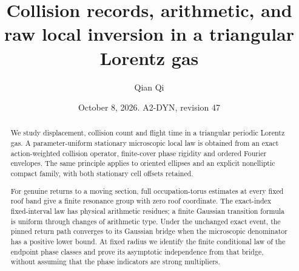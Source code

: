 \documentclass[11pt,reqno]{amsart}
\title[Collision records and raw local inversion]{Collision records, arithmetic, and raw local inversion in a triangular Lorentz gas}
\author{Qian Qi}
\date{October 8, 2026. A2-DYN, revision 47}
\numberwithin{equation}{section}
\theoremstyle{definition}\newtheorem{definition}[theorem]{Definition}
\theoremstyle{remark}\newtheorem{remark}[theorem]{Remark}
\begin{document}
\raggedbottom
\begin{abstract}
We study displacement, collision count and flight time in a triangular
periodic Lorentz gas. A parameter-uniform stationary microscopic local
law is obtained from an exact action-weighted collision operator,
finite-cover phase rigidity and ordered Fourier envelopes. The same
principle applies to oriented ellipses and an explicit nonelliptic
compact family, with both stationary cell offsets retained.

For genuine returns to a moving section, full occupation-torus
estimates at every fixed roof band give a finite resonance group with
zero roof coordinate. The exact-index fixed-interval law has physical
arithmetic residues; a finite Gaussian transition formula is uniform
through changes of arithmetic type. Under the unchanged exact event,
the pinned return path converges to its Gaussian bridge when the
microscopic denominator has a positive lower bound. At fixed radius
we identify the finite conditional law of the endpoint phase classes
and prove its asymptotic independence from that bridge, without
assuming that the phase indicators are strong multipliers.


\end{abstract}
\end{document}
